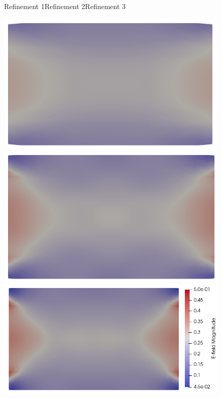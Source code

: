 \documentclass{article}
\begin{document}
\begin{figure}
    \centering
    Refinement 1\hspace{2.5cm}Refinement 2\hspace{2.5cm}Refinement 3\hspace{1cm}
    
    \includegraphics[scale=0.27]{clip_E_T-1_lambda-1e-1_8-2-2.png}
    \includegraphics[scale=0.27]{clip_E_T-1_lambda-1e-1_16-3-3.png}
    \includegraphics[scale=0.27]{clip_E_T-1_lambda-1e-1_32-3-4.png}

\end{figure}
\end{document}
